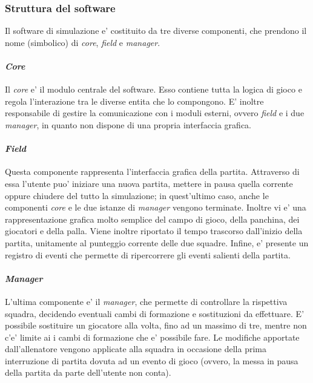 \subsubsection{Struttura del software}
\label{sec:struttura_del_software}

Il software di simulazione e' costituito da tre diverse componenti, che prendono il nome (simbolico) di \textit{core}, \textit{field} e \textit{manager}.

\paragraph{\textit{Core}} \label{sec:struttura_core} Il \textit{core} e' il modulo centrale del software. Esso contiene tutta la logica di gioco e regola l'interazione tra le diverse entita che lo compongono. E' inoltre responsabile di gestire la comunicazione con i moduli esterni, ovvero \textit{field} e i due \textit{manager}, in quanto non dispone di una propria interfaccia grafica.

\paragraph{\textit{Field}} \label{sec:struttura_field} Questa componente rappresenta l'interfaccia grafica della partita. Attraverso di essa l'utente puo' iniziare una nuova partita, mettere in pausa quella corrente oppure chiudere del tutto la simulazione; in quest'ultimo caso, anche le componenti \textit{core} e le due istanze di \textit{manager} vengono terminate. Inoltre vi e' una rappresentazione grafica molto semplice del campo di gioco, della panchina, dei giocatori e della palla. Viene inoltre riportato il tempo trascorso dall'inizio della partita, unitamente al punteggio corrente delle due squadre. Infine, e' presente un registro di eventi che permette di ripercorrere gli eventi salienti della partita.

\paragraph{\textit{Manager}} \label{sec:struttura_manager} L'ultima componente e' il \textit{manager}, che permette di controllare la rispettiva squadra, decidendo eventuali cambi di formazione e sostituzioni da effettuare. E' possibile sostituire un giocatore alla volta, fino ad un massimo di tre, mentre non c'e' limite ai i cambi di formazione che e' possibile fare. Le modifiche apportate dall'allenatore vengono applicate alla squadra in occasione della prima interruzione di partita dovuta ad un evento di gioco (ovvero, la messa in pausa della partita da parte dell'utente non conta).\\

